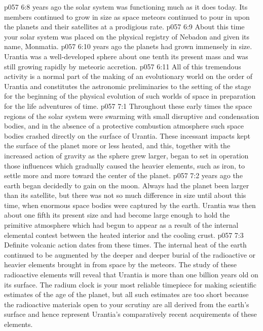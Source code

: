 \pc \vs p057 6:8  years ago the solar system was functioning much as it does today. Its members continued to grow in size as space meteors continued to pour in upon the planets and their satellites at a prodigious rate.
\vs p057 6:9 About this time your solar system was placed on the physical registry of Nebadon and given its name, Monmatia.
\pc \vs p057 6:10  years ago the planets had grown immensely in size. Urantia was a well\hyp{}developed sphere about one tenth its present mass and was still growing rapidly by meteoric accretion.
\vs p057 6:11 All of this tremendous activity is a normal part of the making of an evolutionary world on the order of Urantia and constitutes the astronomic preliminaries to the setting of the stage for the beginning of the physical evolution of such worlds of space in preparation for the life adventures of time.
\vs p057 7:1 Throughout these early times the space regions of the solar system were swarming with small disruptive and condensation bodies, and in the absence of a protective combustion atmosphere such space bodies crashed directly on the surface of Urantia. These incessant impacts kept the surface of the planet more or less heated, and this, together with the increased action of gravity as the sphere grew larger, began to set in operation those influences which gradually caused the heavier elements, such as iron, to settle more and more toward the center of the planet.
\pc \vs p057 7:2  years ago the earth began decidedly to gain on the moon. Always had the planet been larger than its satellite, but there was not so much difference in size until about this time, when enormous space bodies were captured by the earth. Urantia was then about one fifth its present size and had become large enough to hold the primitive atmosphere which had begun to appear as a result of the internal elemental contest between the heated interior and the cooling crust.
\vs p057 7:3 Definite volcanic action dates from these times. The internal heat of the earth continued to be augmented by the deeper and deeper burial of the radioactive or heavier elements brought in from space by the meteors. The study of these radioactive elements will reveal that Urantia is more than one billion years old on its surface. The radium clock is your most reliable timepiece for making scientific estimates of the age of the planet, but all such estimates are too short because the radioactive materials open to your scrutiny are all derived from the earth’s surface and hence represent Urantia’s comparatively recent acquirements of these elements.
